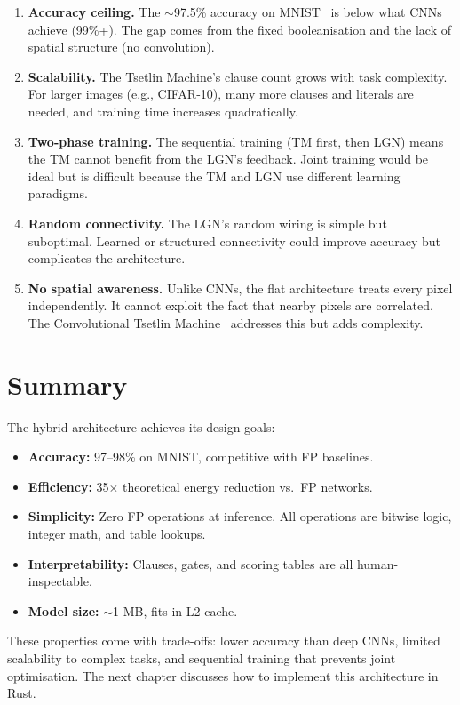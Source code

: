\begin{enumerate}
  \item \textbf{Accuracy ceiling.} The $\sim$97.5\% accuracy on MNIST~\cite{lecun1998mnist} is
    below what CNNs achieve (99\%+). The gap comes from the fixed
    booleanisation and the lack of spatial structure (no convolution).

  \item \textbf{Scalability.} The Tsetlin Machine's clause count
    grows with task complexity. For larger images (e.g., CIFAR-10),
    many more clauses and literals are needed, and training time
    increases quadratically.

  \item \textbf{Two-phase training.} The sequential training
    (TM first, then LGN) means the TM cannot benefit from the LGN's
    feedback. Joint training would be ideal but is difficult because
    the TM and LGN use different learning paradigms.

  \item \textbf{Random connectivity.} The LGN's random wiring is
    simple but suboptimal. Learned or structured connectivity could
    improve accuracy but complicates the architecture.

  \item \textbf{No spatial awareness.} Unlike CNNs, the flat
    architecture treats every pixel independently. It cannot exploit
    the fact that nearby pixels are correlated. The Convolutional
    Tsetlin Machine~\cite{granmo2019convtm} addresses this but adds
    complexity.
\end{enumerate}


\section{Summary}
\label{sec:ch13-summary}

The hybrid architecture achieves its design goals:
\begin{itemize}
  \item \textbf{Accuracy:} 97--98\% on MNIST, competitive with
    FP baselines.
  \item \textbf{Efficiency:} 35$\times$ theoretical energy reduction
    vs.\ FP networks.
  \item \textbf{Simplicity:} Zero FP operations at inference. All
    operations are bitwise logic, integer math, and table lookups.
  \item \textbf{Interpretability:} Clauses, gates, and scoring
    tables are all human-inspectable.
  \item \textbf{Model size:} $\sim$1 MB, fits in L2 cache.
\end{itemize}

These properties come with trade-offs: lower accuracy than deep CNNs,
limited scalability to complex tasks, and sequential training that
prevents joint optimisation. The next chapter discusses how to
implement this architecture in Rust.
